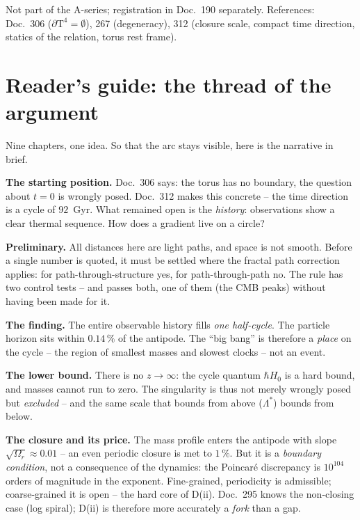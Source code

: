 \documentclass[11pt]{report}
\begin{document}
Not part of the A-series; registration in Doc.~190 separately.
References: Doc.~306 ($\partial\text{T}^4 = \emptyset$), 267
(degeneracy), 312 (closure scale, compact time direction, statics
of the relation, torus rest frame).

\section*{Reader's guide: the thread of the argument}

Nine chapters, one idea. So that the arc stays visible, here is
the narrative in brief.

\textbf{The starting position.} Doc.~306 says: the torus has no
boundary, the question about $t=0$ is wrongly posed. Doc.~312
makes this concrete -- the time direction is a cycle of $92$~Gyr.
What remained open is the \emph{history}: observations show a
clear thermal sequence. How does a gradient live on a circle?

\textbf{Preliminary.} All distances here are light paths, and
space is not smooth. Before a single number is quoted, it must be
settled where the fractal path correction applies: for
path-through-structure yes, for path-through-path no. The rule has
two control tests -- and passes both, one of them (the CMB peaks)
without having been made for it.

\textbf{The finding.} The entire observable history fills
\emph{one half-cycle}. The particle horizon sits within
$0.14\,\%$ of the antipode. The \enquote{big bang} is therefore a
\emph{place} on the cycle -- the region of smallest masses and
slowest clocks -- not an event.

\textbf{The lower bound.} There is no $z \to \infty$: the cycle
quantum $\hbar H_0$ is a hard bound, and masses cannot run to
zero. The singularity is thus not merely wrongly posed but
\emph{excluded} -- and the same scale that bounds from above
($\Lambda^{*}$) bounds from below.

\textbf{The closure and its price.} The mass profile enters the
antipode with slope $\sqrt{\Omega_r} \approx 0.01$ -- an even
periodic closure is met to $1\,\%$. But it is a \emph{boundary
condition}, not a consequence of the dynamics: the Poincaré
discrepancy is $10^{104}$ orders of magnitude in the exponent.
Fine-grained, periodicity is admissible; coarse-grained it is open
-- the hard core of D(ii). Doc.~295 knows the non-closing case
(log spiral); D(ii) is therefore more accurately a \emph{fork}
than a gap.
\end{document}
